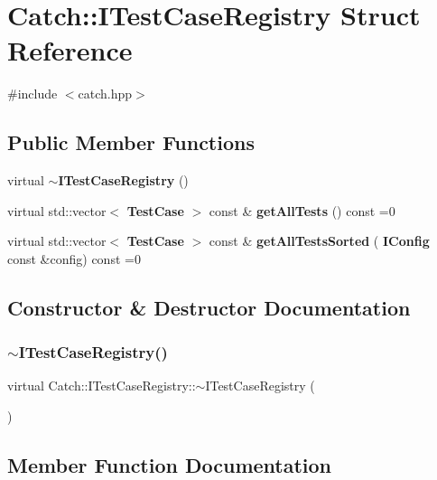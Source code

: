 \section{Catch\+::I\+Test\+Case\+Registry Struct Reference}
\label{struct_catch_1_1_i_test_case_registry}


{\ttfamily \#include $<$catch.\+hpp$>$}

\subsection*{Public Member Functions}
\begin{DoxyCompactItemize}
\item 
virtual \textbf{ $\sim$\+I\+Test\+Case\+Registry} ()
\item 
virtual std\+::vector$<$ \textbf{ Test\+Case} $>$ const  \& \textbf{ get\+All\+Tests} () const =0
\item 
virtual std\+::vector$<$ \textbf{ Test\+Case} $>$ const  \& \textbf{ get\+All\+Tests\+Sorted} (\textbf{ I\+Config} const \&config) const =0
\end{DoxyCompactItemize}


\subsection{Constructor \& Destructor Documentation}
\mbox{\label{struct_catch_1_1_i_test_case_registry_ae14798f05ac8e2b18cff532849a4da81}} 
\subsubsection{$\sim$ITestCaseRegistry()}
{\footnotesize\ttfamily virtual Catch\+::\+I\+Test\+Case\+Registry\+::$\sim$\+I\+Test\+Case\+Registry (\begin{DoxyParamCaption}{ }\end{DoxyParamCaption})\hspace{0.3cm}{\ttfamily [virtual]}}



\subsection{Member Function Documentation}
\mbox{\label{struct_catch_1_1_i_test_case_registry_ad6e4d4a621655123f73ae98cfeda063d}} 

